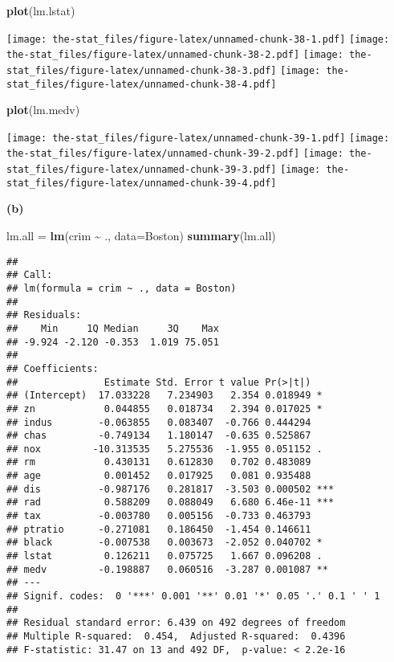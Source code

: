 \documentclass[
]{article}
\newenvironment{Shaded}{\begin{snugshade}}{\end{snugshade}}
\newcommand{\AttributeTok}[1]{\textcolor[rgb]{0.13,0.29,0.53}{#1}}
\newcommand{\FunctionTok}[1]{\textcolor[rgb]{0.13,0.29,0.53}{\textbf{#1}}}
\newcommand{\NormalTok}[1]{#1}
\newcommand{\OtherTok}[1]{\textcolor[rgb]{0.56,0.35,0.01}{#1}}
\newcommand{\SpecialCharTok}[1]{\textcolor[rgb]{0.81,0.36,0.00}{\textbf{#1}}}
\begin{document}
\begin{Shaded}
\begin{Highlighting}[]
\FunctionTok{plot}\NormalTok{(lm.lstat)}
\end{Highlighting}
\end{Shaded}

\texttt{[image: the-stat\_files/figure-latex/unnamed-chunk-38-1.pdf]}
\texttt{[image: the-stat\_files/figure-latex/unnamed-chunk-38-2.pdf]}
\texttt{[image: the-stat\_files/figure-latex/unnamed-chunk-38-3.pdf]}
\texttt{[image: the-stat\_files/figure-latex/unnamed-chunk-38-4.pdf]}

\begin{Shaded}
\begin{Highlighting}[]
\FunctionTok{plot}\NormalTok{(lm.medv)}
\end{Highlighting}
\end{Shaded}

\texttt{[image: the-stat\_files/figure-latex/unnamed-chunk-39-1.pdf]}
\texttt{[image: the-stat\_files/figure-latex/unnamed-chunk-39-2.pdf]}
\texttt{[image: the-stat\_files/figure-latex/unnamed-chunk-39-3.pdf]}
\texttt{[image: the-stat\_files/figure-latex/unnamed-chunk-39-4.pdf]}

\textbf{(b)}

\begin{Shaded}
\begin{Highlighting}[]
\NormalTok{lm.all }\OtherTok{=} \FunctionTok{lm}\NormalTok{(crim }\SpecialCharTok{\textasciitilde{}}\NormalTok{ ., }\AttributeTok{data=}\NormalTok{Boston)}
\FunctionTok{summary}\NormalTok{(lm.all)}
\end{Highlighting}
\end{Shaded}

\begin{verbatim}
## 
## Call:
## lm(formula = crim ~ ., data = Boston)
## 
## Residuals:
##    Min     1Q Median     3Q    Max 
## -9.924 -2.120 -0.353  1.019 75.051 
## 
## Coefficients:
##               Estimate Std. Error t value Pr(>|t|)    
## (Intercept)  17.033228   7.234903   2.354 0.018949 *  
## zn            0.044855   0.018734   2.394 0.017025 *  
## indus        -0.063855   0.083407  -0.766 0.444294    
## chas         -0.749134   1.180147  -0.635 0.525867    
## nox         -10.313535   5.275536  -1.955 0.051152 .  
## rm            0.430131   0.612830   0.702 0.483089    
## age           0.001452   0.017925   0.081 0.935488    
## dis          -0.987176   0.281817  -3.503 0.000502 ***
## rad           0.588209   0.088049   6.680 6.46e-11 ***
## tax          -0.003780   0.005156  -0.733 0.463793    
## ptratio      -0.271081   0.186450  -1.454 0.146611    
## black        -0.007538   0.003673  -2.052 0.040702 *  
## lstat         0.126211   0.075725   1.667 0.096208 .  
## medv         -0.198887   0.060516  -3.287 0.001087 ** 
## ---
## Signif. codes:  0 '***' 0.001 '**' 0.01 '*' 0.05 '.' 0.1 ' ' 1
## 
## Residual standard error: 6.439 on 492 degrees of freedom
## Multiple R-squared:  0.454,  Adjusted R-squared:  0.4396 
## F-statistic: 31.47 on 13 and 492 DF,  p-value: < 2.2e-16
\end{verbatim}
\end{document}
